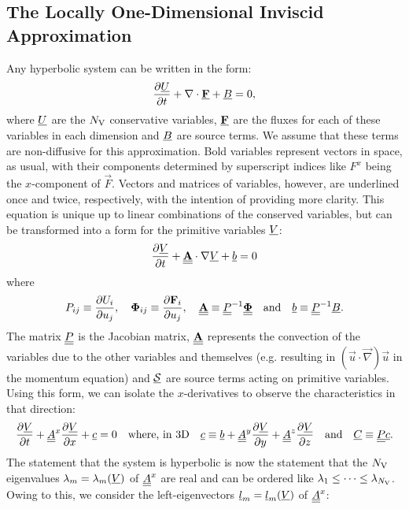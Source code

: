 \subsection{The Locally One-Dimensional Inviscid Approximation}

Any hyperbolic system can be written in the form:
\begin{equation} \label{eqn:hyp-source}
\pdv{\und{U}}{t} + \vec{\nabla}\cdot\und{\vec{F}} + \und{B} = 0,
\end{equation}
where $\und{U}$ are the $N_\rm{V}$ conservative variables, $\und{\vec{F}}$ are the fluxes for each of these variables in each dimension and $\und{B}$ are source terms. We assume that these terms are non-diffusive for this approximation. Bold variables represent vectors in space, as usual, with their components determined by superscript indices like $F^x$ being the $x$-component of $\vec{F}$. Vectors and matrices of variables, however, are underlined once and twice, respectively, with the intention of providing more clarity. This equation is unique up to linear combinations of the conserved variables, but can be transformed into a form for the primitive variables $\und{V}$:
\begin{equation}
\pdv{\und{V}}{t} + \undt{\vec{A}} \cdot \vec{\nabla} \und{V} + \und{b} = 0
\end{equation}
where
\begin{equation}
P_{ij} \equiv \pdv{U_i}{u_j},
\quad
\boldsymbol{\Phi}_{ij} \equiv \pdv{\vec{F}_i}{u_j},
\quad
\undt{\vec{A}} \equiv \undt{P}^{-1}\undt{\boldsymbol{\Phi}}
\quad \text{and} \quad
\und{b} \equiv \undt{{P}}^{-1}\und{B}.
\end{equation}
The matrix $\undt{P}$ is the Jacobian matrix, $\undt{\vec{A}}$ represents the convection of the variables due to the other variables and themselves (e.g. resulting in $(\vec{u} \cdot \vec{\nabla})\vec{u}$ in the momentum equation) and $\und{\cl{S}}$ are source terms acting on primitive variables. Using this form, we can isolate the $x$-derivatives to observe the characteristics in that direction:
\begin{equation} \label{eqn:with_A}
\pdv{\und{V}}{t} + \undt{A}^x \pdv{\und{V}}{x} + \und{c} = 0
\quad \text{where, in 3D} \quad
\und{c} \equiv \und{b} + \undt{A}^y \pdv{\und{V}}{y} + \undt{A}^z \pdv{\und{V}}{z}
\quad \text{and} \quad
\und{C} \equiv \undt{P} \und{c}.
\end{equation}
The statement that the system is hyperbolic is now the statement that the $N_\rm{V}$ eigenvalues $\l_m = \l_m(\und{V})$ of $\undt{A}^x$ are real and can be ordered like $\l_1 \leq \dots \leq \l_{N_\rm{V}}$. Owing to this, we consider the left-eigenvectors $\und{l}_m = \und{l}_m(\und{V})$ of $\undt{A}^x$:
